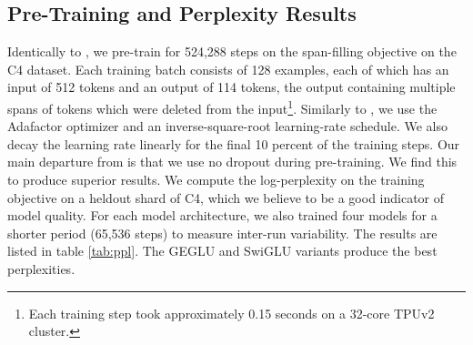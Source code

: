 \documentclass{article}
\begin{document}
\begin{table}[h]
\caption{Heldout-set log-perplexity for Transformer models on the segment-filling task from \citep{raffel2019exploring}.  All models are matched for parameters and computation.}
\label{tab:ppl}
\begin{center}
\vspace{-2mm}
\end{center}
\end{table}


\subsection{Pre-Training and Perplexity Results}
Identically to \citep{raffel2019exploring}, we pre-train for 524,288 steps on the span-filling objective on the C4 dataset.  Each training batch consists of 128 examples, each of which has an input of 512 tokens and an output of 114 tokens, the output containing multiple spans of tokens which were deleted from the input\footnote{Each training step took approximately 0.15 seconds on a 32-core TPUv2 cluster.}.  Similarly to \citep{raffel2019exploring}, we use the Adafactor optimizer \citep{shazeer2018adafactor} and an inverse-square-root learning-rate schedule.  We also decay the learning rate linearly for the final 10 percent of the training steps.   Our main departure from \citep{raffel2019exploring} is that we use no dropout during pre-training.  We find this to produce superior results. We compute the log-perplexity on the training objective on a heldout shard of C4, which we believe to be a good indicator of model quality.  For each model architecture, we also trained four models for a shorter period (65,536 steps) to measure inter-run variability.  The results are listed in table \ref{tab:ppl}.  The GEGLU and SwiGLU variants produce the best perplexities.
\end{document}
